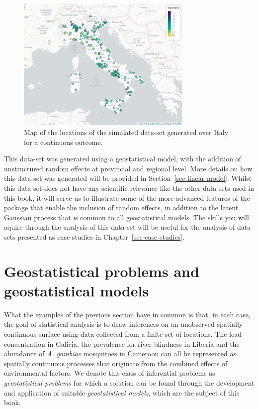 \documentclass[
  letterpaper,
]{krantz}
\begin{document}
\begin{figure}

{\centering \includegraphics[width=3.31in,height=\textheight]{./figures/italy_sim_ch1.png}

}

\caption{\label{fig-italy-sim-ch1}Map of the locations of the simulated
data-set generated over Italy for a continuous outcome.}

\end{figure}

This data-set was generated using a geostatistical model, with the
addition of unstructured random effects at provincial and regional
level. More details on how this data-set was generated will be provided
in Section~\ref{sec-linear-model}. Whilst this data-set does not have
any scientific relevance like the other data-sets used in this book, it
will serve us to illustrate some of the more advanced features of the
package that enable the inclusion of random effects, in addition to the
latent Gaussian process that is common to all geostatistical models. The
skills you will aquire through the analysis of this data-set will be
useful for the analysis of data-sets presented as case studies in
Chapter~\ref{sec-case-studies}.

\hypertarget{sec-geostat-models}{%
\section{Geostatistical problems and geostatistical
models}\label{sec-geostat-models}}

What the examples of the previous section have in common is that, in
each case, the goal of statistical analysis is to draw inferences on an
unobserved spatially continuous surface using data collected from a
finite set of locations. The lead concentration in Galicia, the
prevalence for river-blindness in Liberia and the abundance of \emph{A.
gambiae} mosquitoes in Cameroon can all be represented as spatially
continuous processes that originate from the combined effects of
environmental factors. We denote this class of inferential problems as
\emph{geostatistical problems} for which a solution can be found through
the development and application of suitable \emph{geostatistical
models}, which are the subject of this book.
\end{document}
